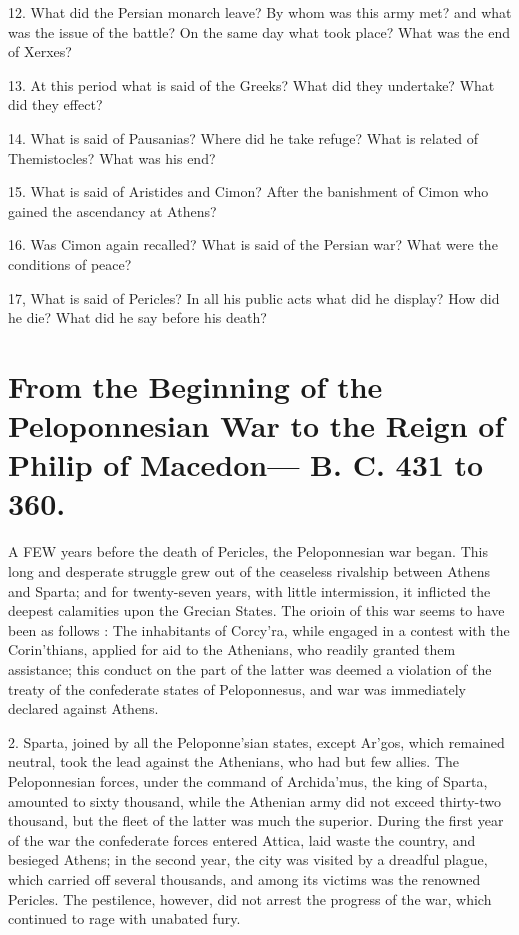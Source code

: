 \documentclass[openany,a4paper]{memoir}
\begin{document}
12. What did the 
Persian monarch leave? By whom was this army met? and what was 
the issue of the battle? On the same day what took place? What was 
the end of Xerxes? 

13. At this period what is said of the Greeks? 
What did they undertake? What did they effect? 

14. What is said of Pausanias? Where did he take refuge? 
What is related of Themistocles? What was his end? 

15. What is 
said of Aristides and Cimon? After the banishment of Cimon who 
gained the ascendancy at Athens? 

16. Was Cimon again recalled? 
What is said of the Persian war? What were the conditions of peace? 

17, What is said of Pericles? In all his public acts what did he 
display? How did he die? What did he say before his death? 



\chapter{From the Beginning of the Peloponnesian War to 
the Reign of Philip of Macedon— B. C. 431 to 360.} 

A FEW years before the death of Pericles, the Peloponnesian war began. This long and desperate struggle 
grew out of the ceaseless rivalship between Athens and 
Sparta; and for twenty-seven years, with little intermission, 
it inflicted the deepest calamities upon the Grecian States. 
The orioin of this war seems to have been as follows : The 
inhabitants of Corcy'ra, while engaged in a contest with the 
Corin'thians, applied for aid to the Athenians, who readily 
granted them assistance; this conduct on the part of the 
latter was deemed a violation of the treaty of the confederate 
states of Peloponnesus, and war was immediately declared 
against Athens. 

2. Sparta, joined by all the Peloponne'sian states, except 
Ar'gos, which remained neutral, took the lead against the 
Athenians, who had but few allies. The Peloponnesian forces, 
under the command of Archida'mus, the king of Sparta, 
amounted to sixty thousand, while the Athenian army did not 
exceed thirty-two thousand, but the fleet of the latter was 
much the superior. During the first year of the war the confederate forces entered Attica, laid waste the country, and 
besieged Athens; in the second year, the city was visited by 
a dreadful plague, which carried off several thousands, and 
among its victims was the renowned Pericles. The pestilence, however, did not arrest the progress of the war, which 
continued to rage with unabated fury. 
\end{document}
